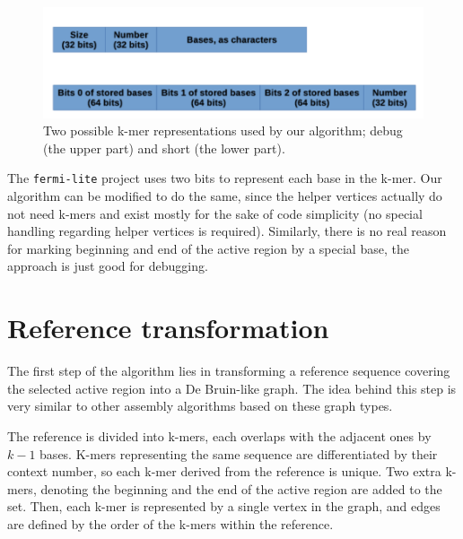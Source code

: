 \begin{figure}[h]
	\centering
	\includegraphics{img/kmer-representations}
	\caption{Two possible k-mer representations used by our algorithm; debug (the upper part) and short (the lower part).}
	\label{fig:kmer-representations}
\end{figure}

The \texttt{fermi-lite} project uses two bits to represent each base in the k-mer. Our algorithm can be modified to do the same, since the helper vertices actually do not need k-mers and exist mostly for the sake of code simplicity (no special handling regarding helper vertices is required). Similarly, there is no real reason for marking beginning and end of the active region by a special base, the approach is just good for debugging.

\section{Reference transformation}
\label{sec:reference-transformation}

The first step of the algorithm lies in transforming a reference sequence covering the selected active region into a De Bruin-like graph. The idea behind this step is very similar to other assembly algorithms based on these graph types. 

The reference is divided into k-mers, each overlaps with the adjacent ones by $k-1$ bases. K-mers representing the same sequence are differentiated by their context number, so each k-mer derived from the reference is unique. Two extra k-mers, denoting the beginning and the end of the active region are added to the set. Then, each k-mer is represented by a single vertex in the graph, and edges are defined by the order of the k-mers within the reference.

